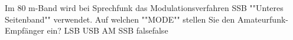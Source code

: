     {Im 80 m-Band wird bei Sprechfunk das Modulationsverfahren SSB ""Unteres Seitenband"" verwendet. Auf welchen ""MODE"" stellen Sie den Amateurfunk-Empfänger ein?}
    {LSB}
    {USB}
    {AM}
    {SSB}
    {false}{false}